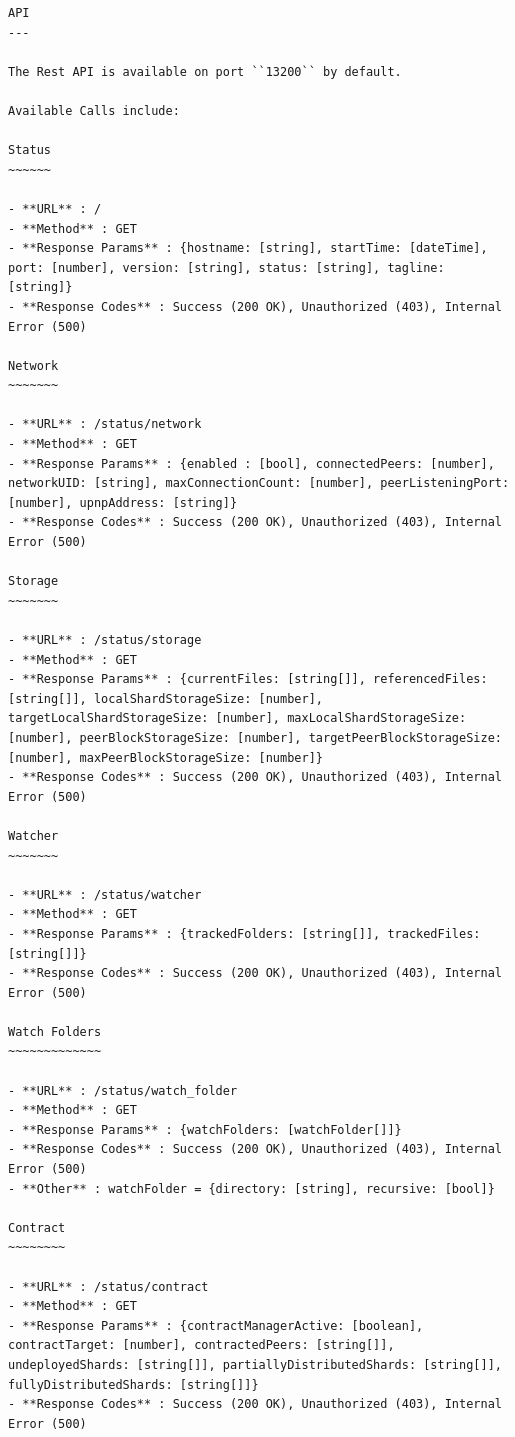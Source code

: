 \documentclass[11pt, a4paper, twoside]{report}
\begin{document}
\begin{lstlisting}[language=RsT, caption=Membrane API Documentation, label=lst:apiDocs]
API
---

The Rest API is available on port ``13200`` by default.

Available Calls include:

Status
~~~~~~

- **URL** : /
- **Method** : GET
- **Response Params** : {hostname: [string], startTime: [dateTime], port: [number], version: [string], status: [string], tagline: [string]}
- **Response Codes** : Success (200 OK), Unauthorized (403), Internal Error (500)

Network
~~~~~~~

- **URL** : /status/network
- **Method** : GET
- **Response Params** : {enabled : [bool], connectedPeers: [number], networkUID: [string], maxConnectionCount: [number], peerListeningPort: [number], upnpAddress: [string]}
- **Response Codes** : Success (200 OK), Unauthorized (403), Internal Error (500)

Storage
~~~~~~~

- **URL** : /status/storage
- **Method** : GET
- **Response Params** : {currentFiles: [string[]], referencedFiles: [string[]], localShardStorageSize: [number], targetLocalShardStorageSize: [number], maxLocalShardStorageSize: [number], peerBlockStorageSize: [number], targetPeerBlockStorageSize: [number], maxPeerBlockStorageSize: [number]}
- **Response Codes** : Success (200 OK), Unauthorized (403), Internal Error (500)

Watcher
~~~~~~~

- **URL** : /status/watcher
- **Method** : GET
- **Response Params** : {trackedFolders: [string[]], trackedFiles: [string[]]}
- **Response Codes** : Success (200 OK), Unauthorized (403), Internal Error (500)

Watch Folders
~~~~~~~~~~~~~

- **URL** : /status/watch_folder
- **Method** : GET
- **Response Params** : {watchFolders: [watchFolder[]]}
- **Response Codes** : Success (200 OK), Unauthorized (403), Internal Error (500)
- **Other** : watchFolder = {directory: [string], recursive: [bool]}

Contract
~~~~~~~~

- **URL** : /status/contract
- **Method** : GET
- **Response Params** : {contractManagerActive: [boolean], contractTarget: [number], contractedPeers: [string[]], undeployedShards: [string[]], partiallyDistributedShards: [string[]], fullyDistributedShards: [string[]]}
- **Response Codes** : Success (200 OK), Unauthorized (403), Internal Error (500)


\end{lstlisting}
\end{document}
